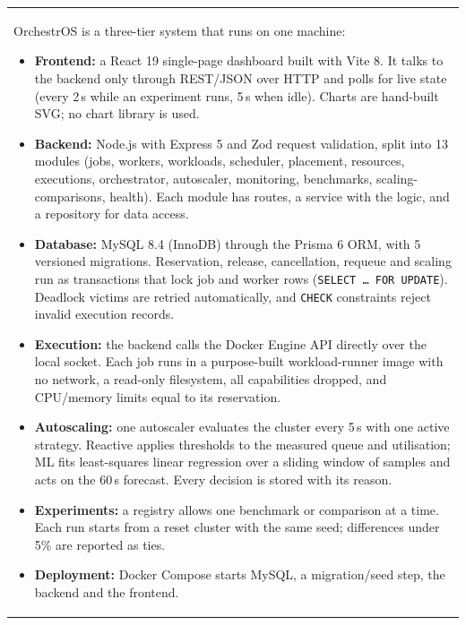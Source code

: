 \documentclass[12pt,a4paper]{article}
\newcommand{\answerbox}[2]{%
    \noindent
    \begin{tabularx}{\textwidth}{
        |>{\raggedright\arraybackslash}X|}
        \hline
        \parbox[t]{\dimexpr\linewidth-12pt\relax}{
            \vspace{5pt}
            \fontsize{10.5}{13}\selectfont #2
            \par\vspace{6pt}
        }\\
        \hline
    \end{tabularx}
}
\begin{document}
\vspace{0.25cm}
\answerbox{4.75cm}{%
OrchestrOS is a three-tier system that runs on one machine:
\begin{itemize}
    \item \textbf{Frontend:} a React 19 single-page dashboard built with Vite 8. It talks to the backend
    only through REST/JSON over HTTP and polls for live state (every 2\,s while an experiment runs,
    5\,s when idle). Charts are hand-built SVG; no chart library is used.
    \item \textbf{Backend:} Node.js with Express 5 and Zod request validation, split into 13 modules
    (jobs, workers, workloads, scheduler, placement, resources, executions, orchestrator, autoscaler,
    monitoring, benchmarks, scaling-comparisons, health). Each module has routes, a service with the
    logic, and a repository for data access.
    \item \textbf{Database:} MySQL 8.4 (InnoDB) through the Prisma 6 ORM, with 5 versioned migrations.
    Reservation, release, cancellation, requeue and scaling run as transactions that lock job and
    worker rows (\texttt{SELECT \ldots{} FOR UPDATE}). Deadlock victims are retried automatically, and
    \texttt{CHECK} constraints reject invalid execution records.
    \item \textbf{Execution:} the backend calls the Docker Engine API directly over the local socket.
    Each job runs in a purpose-built workload-runner image with no network, a read-only filesystem,
    all capabilities dropped, and CPU/memory limits equal to its reservation.
    \item \textbf{Autoscaling:} one autoscaler evaluates the cluster every 5\,s with one active
    strategy. Reactive applies thresholds to the measured queue and utilisation; ML fits
    least-squares linear regression over a sliding window of samples and acts on the 60\,s forecast.
    Every decision is stored with its reason.
    \item \textbf{Experiments:} a registry allows one benchmark or comparison at a time. Each run starts
    from a reset cluster with the same seed; differences under 5\% are reported as ties.
    \item \textbf{Deployment:} Docker Compose starts MySQL, a migration/seed step, the backend and
    the frontend.
\end{itemize}}

\newpage

\vspace*{0.20cm}
\end{document}
